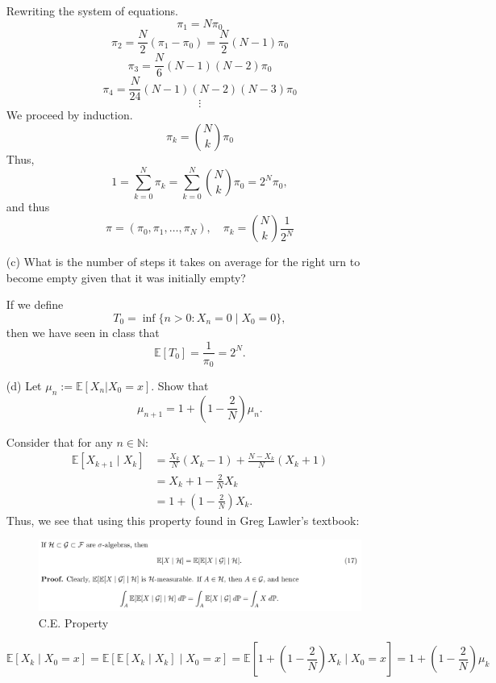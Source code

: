 \documentclass[11pt]{article}
\newcommand{\bbE}{\mathbb{E}}
\newcommand{\bbN}{\mathbb{N}}
\begin{document}
\begin{enumerate}
\begin{solution}
Rewriting the system of equations.
\[\pi_1 = N\pi_0\]
\[\pi_2 = \frac{N}{2}(\pi_1- \pi_0) = \frac{N}{2}(N-1)\pi_0\]
\[\pi_3 = \frac{N}{6}(N-1)(N-2)\pi_0\]
\[\pi_4 = \frac{N}{24}(N-1)(N-2)(N-3)\pi_0\]
\[\vdots\]
We proceed by induction.
\[\pi_k = \binom{N}{k}\pi_0\]
Thus,
\[1 = \sum_{k=0}^N \pi_k = \sum_{k=0}^N \binom{N}{k}\pi_0 = 2^N\pi_0,\] and thus 
\[\boxed{\pi = (\pi_0, \pi_1, \dots, \pi_N), \quad \pi_k = \binom{N}{k} \frac{1}{2^N}}\]

\end{solution}
    \item[(c)] What is the number of steps it takes on average for the right urn to become empty given that it was initially empty?
\begin{solution}
    If we define 
    \[T_0 = \inf \{n >0 : X_n = 0 \mid X_0 = 0\},\] then we have seen in class that
    \[\boxed{\bbE[T_0] = \frac{1}{\pi_0} = 2^N}.\]
\end{solution}
    \item[(d)] Let \( \mu_n := \mathbb{E}[X_n | X_0 = x] \). Show that
    \[
    \mu_{n+1} = 1 + \left( 1 - \frac{2}{N} \right) \mu_n.
    \]
    \begin{solution}

Consider that for any $n \in \bbN:$
\begin{align*}
    \bbE[X_{k + 1}\mid X_k] &= \frac{X_k}{N}(X_k -1)+ \frac{N-X_k}{N}(X_k + 1)\\
    &= X_k + 1 - \frac{2}{N}X_k\\
    &= 1 + (1 - \frac{2}{N})X_k.
\end{align*}
Thus, we see that using this property found in Greg Lawler's textbook: 
\begin{figure}[H]
    \centering
    \includegraphics[width=0.5\linewidth]{Images/conditional expectation.png}
    \caption{C.E. Property}
\end{figure}
\[\bbE[X_k \mid X_0 = x] = \bbE[\bbE[X_k \mid X_k] \mid X_0 = x] = \bbE\left[1 + (1 - \frac{2}{N})X_k \mid X_0 = x\right] = 1 + (1-\frac{2}{N})\mu_k\]


\end{solution}
\end{enumerate}
\end{document}
